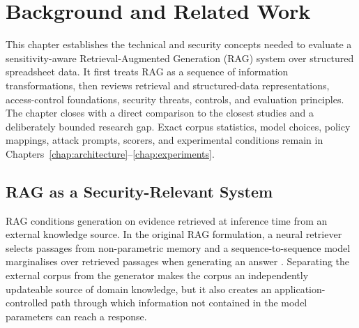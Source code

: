 \chapter{Background and Related Work}
\label{chap:background}

This chapter establishes the technical and security concepts needed to evaluate a sensitivity-aware Retrieval-Augmented Generation (RAG) system over structured spreadsheet data. It first treats RAG as a sequence of information transformations, then reviews retrieval and structured-data representations, access-control foundations, security threats, controls, and evaluation principles. The chapter closes with a direct comparison to the closest studies and a deliberately bounded research gap. Exact corpus statistics, model choices, policy mappings, attack prompts, scorers, and experimental conditions remain in Chapters~\ref{chap:architecture}--\ref{chap:experiments}.

\section{RAG as a Security-Relevant System}
\label{sec:background-rag-system}

RAG conditions generation on evidence retrieved at inference time from an external knowledge source. In the original RAG formulation, a neural retriever selects passages from non-parametric memory and a sequence-to-sequence model marginalises over retrieved passages when generating an answer \citep{lewis2020rag}. Separating the external corpus from the generator makes the corpus an independently updateable source of domain knowledge, but it also creates an application-controlled path through which information not contained in the model parameters can reach a response.

